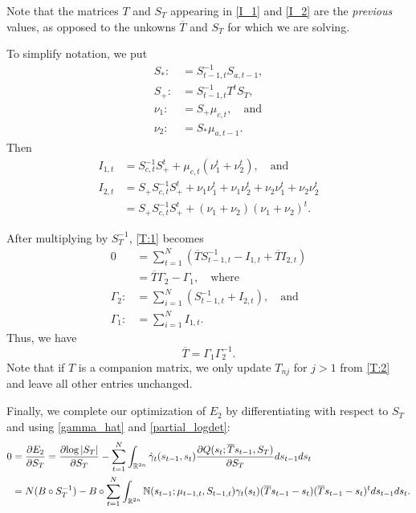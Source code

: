\documentclass[12pt,leqno]{article}
\begin{document}
Note that the matrices $T$ and $S_T$ appearing in \eqref{I_1} and \eqref{I_2} are the {\em previous}
values, as opposed to the unkowns $\overline{T}$ and $S_T$ for which we are solving.

To simplify notation, we put
\begin{align*}
S_* :&= S_{t-1,t}^{-1}S_{a,t-1},\\
S_+ :&= S_{t-1,t}^{-1}T^tS_T,\\
\nu_1 :&= S_+\mu_{c,t},\quad\text{and}\\
\nu_2 :&= S_*\mu_{a,t-1}.
\end{align*}
Then
\begin{align*}
  I_{1,t} &= S_{c,t}^{-1}S_+^t +\mu_{c,t}(\nu_1^t + \nu_2^t), \quad\text{and}\\
  I_{2,t} &= S_+S_{c,t}^{-1}S_+^t+\nu_1\nu_1^t + \nu_1\nu_2^t + \nu_2\nu_1^t + \nu_2\nu_2^t \\
      &= S_+S_{c,t}^{-1}S_+^t + (\nu_1+\nu_2)(\nu_1+\nu_2)^t.
\end{align*}

After multiplying by $S_T^{-1}$, \eqref{T:1} becomes
\begin{align*}
 0 &= \sum_{t=1}^N\left(\overline{T}S_{t-1,t}^{-1} - I_{1,t} + \overline{T}I_{2,t}\right)\\
  &= \overline{T}\Gamma_2 - \Gamma_1, \quad\text{where} \\
  \Gamma_2 :&= \sum_{i=1}^N(S_{t-1,t}^{-1} + I_{2,t}),\quad\text{and}\\
  \Gamma_1 :&= \sum_{i=1}^NI_{1,t}.
\end{align*}
Thus,  we have
\begin{equation}\label{T:2}
  \overline{T} = \Gamma_1\Gamma_2^{-1}.
\end{equation}
Note that if $T$ is a companion matrix, we only update $T_{nj}$ for $j > 1$ from \eqref{T:2} and
leave all other entries unchanged.

Finally, we complete our optimization of $E_2$ by differentiating with respect to $S_T$ and using \eqref{gamma_hat} and \eqref{partial_logdet}:
\begin{equation}\label{Sigma_Tr:0}
  \begin{split}
  0 &= \frac{\partial{E_2}}{\partial{S_T}} = \frac{\partial{\log|S_T|}}{\partial{S}_T}
  - \sum_{t=1}^N\int_{{\mathbb R}^{2n}}\hat{\gamma}_t(s_{t-1},s_t)\frac{\partial{Q(s_t;\overline{T}s_{t-1},S_T)}}
  {\partial{S}_T}ds_{t-1}ds_t \\
  &= N(B\circ{S}_T^{-1}) -B\circ\sum_{t=1}^N\int_{{\mathbb R}^{2n}}{\mathbb N}(s_{t-1};\mu_{t-1,t},S_{t-1,t})
  \gamma_t(s_t)(\overline{T}s_{t-1}-s_t)(\overline{T}s_{t-1}-s_t)^tds_{t-1}ds_t.
  \end{split}
\end{equation}
\end{document}
